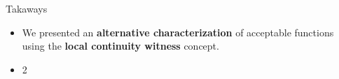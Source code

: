 \begin{frame}{Takaways}
    \pause
    \begin{itemize}
        \item We presented an \textbf{alternative characterization} of acceptable functions \pause using the \textbf{local continuity witness} concept.
        \pause \item 2
    \end{itemize}
\end{frame}
